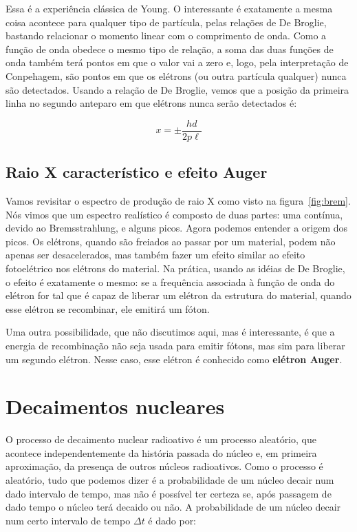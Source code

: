 \documentclass{article}
\begin{document}
Essa \'e a experi\^encia cl\'assica de Young. O interessante \'e exatamente a mesma coisa acontece para qualquer tipo de part\'icula, pelas rela\c c\~oes de De Broglie, bastando relacionar o momento linear com o comprimento de onda. Como a fun\c c\~ao de onda obedece o mesmo tipo de rela\c c\~ao, a soma das duas fun\c c\~oes de onda tamb\'em ter\'a pontos em que o valor vai a zero e, logo, pela interpreta\c c\~ao de Conpehagem, s\~ao pontos em que os el\'etrons (ou outra part\'icula qualquer) nunca s\~ao detectados. Usando a rela\c c\~ao de De Broglie, vemos que a posi\c c\~ao da primeira linha no segundo anteparo em que el\'etrons nunca ser\~ao detectados \'e:

\begin{equation}
x = \pm\frac{hd}{2p\ell}
\end{equation}

\subsection{Raio X caracter\'istico e efeito Auger}

Vamos revisitar o espectro de produ\c c\~ao de raio X como visto na figura~\ref{fig:brem}. N\'os vimos que um espectro real\'istico \'e composto de duas partes: uma cont\'inua, devido ao Bremsstrahlung, e alguns picos. Agora podemos entender a origem dos picos. Os el\'etrons, quando s\~ao freiados ao passar por um material, podem n\~ao apenas ser desacelerados, mas tamb\'em fazer um efeito similar ao efeito fotoel\'etrico nos el\'etrons do material. Na pr\'atica, usando as id\'eias de De Broglie, o efeito \'e exatamente o mesmo: se a frequ\^encia associada \`a fun\c c\~ao de onda do el\'etron for tal que \'e capaz de liberar um el\'etron da estrutura do material, quando esse el\'etron se recombinar, ele emitir\'a um f\'oton.

Uma outra possibilidade, que n\~ao discutimos aqui, mas \'e interessante, \'e que a energia de recombina\c c\~ao n\~ao seja usada para emitir f\'otons, mas sim para liberar um segundo el\'etron. Nesse caso, esse el\'etron \'e conhecido como \textbf{el\'etron Auger}.

\section{Decaimentos nucleares}

O processo de decaimento nuclear radioativo \'e um processo aleat\'orio, que acontece independentemente da hist\'oria passada do n\'ucleo e, em primeira aproxima\c c\~ao, da presen\c ca de outros n\'ucleos radioativos. Como o processo \'e aleat\'orio, tudo que podemos dizer \'e a probabilidade de um n\'ucleo decair num dado intervalo de tempo, mas n\~ao \'e poss\'ivel ter certeza se, ap\'os passagem de dado tempo o n\'ucleo ter\'a decaido ou n\~ao. A probabilidade de um n\'ucleo decair num certo intervalo de tempo $\Delta t$ \'e dado por:
\end{document}
